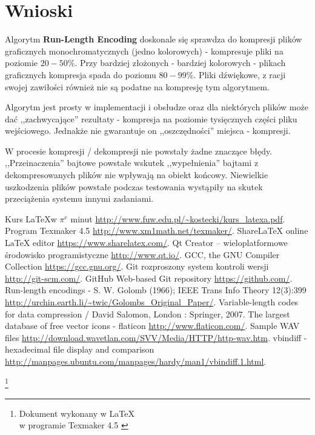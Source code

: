 \documentclass[12pt,a4paper,notitlepage]{report}
\newcommand\blfootnote[1]{%
  \begingroup
  \renewcommand\thefootnote{}\footnote{#1}%
  \addtocounter{footnote}{-1}%
  \endgroup
}
\begin{document}
\section{Wnioski}
Algorytm \textbf{Run-Length Encoding} doskonale się sprawdza do kompresji plików graficznych monochromatycznych (jedno kolorowych) - kompresuje pliki na poziomie $20-50 \%$. Przy bardziej złożonych - bardziej kolorowych - plikach graficznych kompresja spada do poziomu $80-99\%$. Pliki dźwiękowe, z racji swojej zawiłości również nie są podatne na kompresję tym algorytmem.

Algorytm jest prosty w implementacji i obsłudze oraz dla niektórych plików może dać ,,zachwycające'' rezultaty - kompresja na poziomie tysięcznych części pliku wejściowego. Jednakże nie gwarantuje on ,,oszczędności'' miejsca - kompresji.

W procesie kompresji / dekompresji nie powstały żadne znaczące błędy. ,,Przeinaczenia'' bajtowe powstałe wskutek ,,wypełnienia'' bajtami z dekompresowanych plików nie wpływają na obiekt końcowy.\newline
Niewielkie uszkodzenia plików powstałe podczas testowania wystąpiły na skutek przeciążenia systemu innymi zadaniami.

\begin{thebibliography}{1}
	 Kurs \LaTeX w $\pi^e$ minut \url{http://www.fuw.edu.pl/~kostecki/kurs_latexa.pdf}.
	 Program Texmaker 4.5 \url{http://www.xm1math.net/texmaker/}.
	 ShareLaTeX online LaTeX editor \url{https://www.sharelatex.com/}.	
	 Qt Creator – wieloplatformowe środowisko programistyczne \url{http://www.qt.io/}.
	 GCC, the GNU Compiler Collection \url{https://gcc.gnu.org/}.
	 Git rozproszony system kontroli wersji \url{http://git-scm.com/}.
	 GitHub Web-based Git repository \url{https://github.com/}.
	 Run-length encodings - S. W. Golomb (1966); IEEE Trans Info Theory 12(3):399 \url{http://urchin.earth.li/~twic/Golombs_Original_Paper/}.
	 Variable-length codes for data compression / David Salomon, London : Springer, 2007.
	 The largest database of free vector icons - flaticon \url{http://www.flaticon.com/}.
	 Sample WAV files \url{http://download.wavetlan.com/SVV/Media/HTTP/http-wav.htm}.
	 vbindiff - hexadecimal file display and comparison \url{http://manpages.ubuntu.com/manpages/hardy/man1/vbindiff.1.html}.
\end{thebibliography}

	\blfootnote{Dokument wykonany w \LaTeX \cite{latex} \\ w programie Texmaker 4.5 \cite{program}}	
\end{document}

